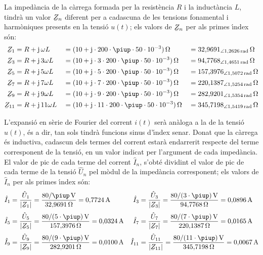 \begin{exemple}
La imped\`{a}ncia de la c\`{a}rrega formada per la resist\`{e}ncia $R$ i la
induct\`{a}ncia $L$, tindr\`{a} un valor $\cmplx{Z}_n$ diferent per a
cadascuna de les tensions fonamental i harm\`{o}niques presents en la
tensi\'{o} $u(t)$; els valors de $\cmplx{Z}_n$ per als primes \'{\i}ndex s\'{o}n:
\begin{alignat*}{3}
    \cmplx{Z}_1 &= R + \ju\, \omega L &&= (10 + \ju\cdot 200\cdot \piup\cdot 50\cdot 10^{-3})\unit{\ohm} &&=32{,}9691_{\angle
    1{,}2626\unit{rad}}\unit{\ohm}\\
    \cmplx{Z}_3 &= R + \ju\, 3 \omega L &&= (10 + \ju\cdot 3\cdot 200\cdot \piup\cdot 50\cdot 10^{-3})\unit{\ohm} &&=94{,}7768_{\angle
    1{,}4651\unit{rad}}\unit{\ohm}\\
    \cmplx{Z}_5 &= R + \ju\, 5 \omega L &&= (10 + \ju\cdot 5\cdot 200\cdot \piup\cdot 50\cdot 10^{-3})\unit{\ohm} &&=157{,}3976_{\angle
    1{,}5072\unit{rad}}\unit{\ohm}\\
    \cmplx{Z}_7 &= R + \ju\, 7 \omega L &&= (10 + \ju\cdot 7\cdot 200\cdot \piup\cdot 50\cdot 10^{-3})\unit{\ohm} &&=220{,}1387_{\angle
    1{,}5254\unit{rad}}\unit{\ohm}\\
    \cmplx{Z}_9 &= R + \ju\, 9 \omega L &&= (10 + \ju\cdot 9\cdot 200\cdot \piup\cdot 50\cdot 10^{-3})\unit{\ohm} &&=282{,}9201_{\angle
    1{,}5354\unit{rad}}\unit{\ohm}\\
    \cmplx{Z}_{11} &= R + \ju\, 11 \omega L &&= (10 + \ju\cdot 11\cdot 200\cdot \piup\cdot 50\cdot 10^{-3})\unit{\ohm} &&=345{,}7198_{\angle
    1{,}5419\unit{rad}}\unit{\ohm}
\end{alignat*}

L'expansi\'{o} en s\`{e}rie de Fourier del corrent $i(t)$ ser\`{a} an\`{a}loga a la
de la tensi\'{o} $u(t)$, \'{e}s a dir, tan sols tindr\`{a} funcions sinus
d'\'{\i}ndex senar. Donat que la c\`{a}rrega \'{e}s inductiva, cadascun dels
termes del corrent estar\`{a} endarrerit respecte del terme corresponent
de la tensi\'{o}, en un valor indicat per l'argument de cada imped\`{a}ncia.
El valor de pic de cada terme del corrent $\hat{I}_n$, s'obt\'{e}
dividint el valor de pic de cada terme de la tensi\'{o} $\hat{U}_n$ pel
m\`{o}dul de la imped\`{a}ncia corresponent; els valors de $\hat{I}_n$ per
als primes \'{\i}ndex s\'{o}n:
\begin{align*}
    \hat{I}_1 &= \frac{\hat{U}_1}{|\cmplx{Z}_1|} = \frac{80/\piup\unit{V}}{32{,}9691\unit{\ohm}} = 0{,}7724\unit{A}
    & \hat{I}_3 &= \frac{\hat{U}_3}{|\cmplx{Z}_3|} =\frac{80/(3\cdot\piup)\unit{V}}{94{,}7768\unit{\ohm}} = 0{,}0896\unit{A}\\[0.5ex]
    \hat{I}_5 &= \frac{\hat{U}_5}{|\cmplx{Z}_5|} =\frac{80/(5\cdot\piup)\unit{V}}{157{,}3976\unit{\ohm}} =0{,}0324\unit{A}
    & \hat{I}_7 &= \frac{\hat{U}_7}{|\cmplx{Z}_7|} =\frac{80/(7\cdot\piup)\unit{V}}{220{,}1387\unit{\ohm}} =
    0{,}0165\unit{A}\\[0.5ex]
    \hat{I}_9 &= \frac{\hat{U}_9}{|\cmplx{Z}_9|} =\frac{80/(9\cdot\piup)\unit{V}}{282{,}9201\unit{\ohm}} =
    0{,}0100\unit{A} & \hat{I}_{11} &= \frac{\hat{U}_{11}}{|\cmplx{Z}_{11}|} =\frac{80/(11\cdot\piup)\unit{V}}
    {345{,}7198\unit{\ohm}} =  0{,}0067\unit{A}
\end{align*}


\end{exemple}
